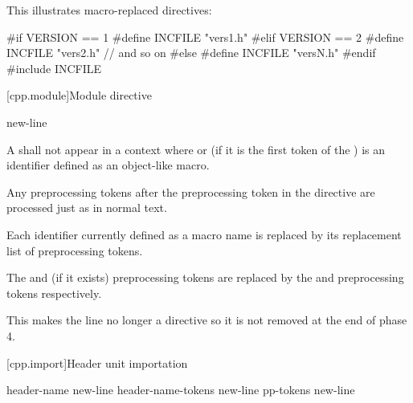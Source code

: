 \pnum
\begin{example}
This illustrates macro-replaced
directives:

\begin{codeblock}
#if VERSION == 1
    #define INCFILE  "vers1.h"
#elif VERSION == 2
    #define INCFILE  "vers2.h"  // and so on
#else
    #define INCFILE  "versN.h"
#endif
#include INCFILE
\end{codeblock}
\end{example}

[cpp.module]{Module directive}
%

\begin{bnf}
\br
       \terminal{;} new-line
\end{bnf}

\pnum
A  shall not
appear in a context where 
or (if it is the first token of the ) 
is an identifier defined as an object-like macro.

\pnum
Any preprocessing tokens after the  preprocessing token
in the  directive are processed just as in normal text.
\begin{note}
Each identifier currently defined as a macro name
is replaced by its replacement list of preprocessing tokens.
\end{note}

\pnum
The  and  (if it exists) preprocessing tokens
are replaced by the  and
 preprocessing tokens respectively.
\begin{note}
This makes the line no longer a directive
so it is not removed at the end of phase 4.
\end{note}

[cpp.import]{Header unit importation}
%
%
%

\begin{bnf}
\br
      header-name  \terminal{;} new-line\br
      header-name-tokens  \terminal{;} new-line\br
      pp-tokens \terminal{;} new-line
\end{bnf}

